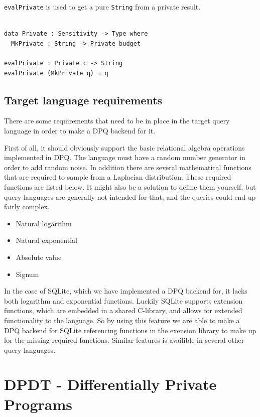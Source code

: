 \documentclass[12pt]{report}
\begin{document}
\texttt{evalPrivate} is used to get a pure \texttt{String} from a private result.

\begin{lstlisting}[caption={Aggregation result ADT},label={lst:DPQ_private}]

data Private : Sensitivity -> Type where
  MkPrivate : String -> Private budget

evalPrivate : Private c -> String
evalPrivate (MkPrivate q) = q

\end{lstlisting}

\section{Target language requirements}\label{sec:DPQ_requirements}

There are some requirements that need to be in place in the target query language in order to make a DPQ backend for it.

First of all, it should obviously support the basic relational algebra operations implemented in DPQ.
The language must have a random number generator in order to add random noise.
In addition there are several mathematical functions that are required to sample from a Laplacian distribution.
These required functions are listed below.
It might also be a solution to define them yourself, but query languages are generally not intended for that, and the queries could end up fairly complex.

\begin{itemize}
    \item Natural logarithm
    \item Natural exponential
    \item Absolute value
    \item Signum
\end{itemize}

In the case of SQLite, which we have implemented a DPQ backend for, it lacks both logarithm and exponential functions.
Luckily SQLite supports extension functions, which are embedded in a shared C-library, and allows for extended functionality to the language.
So by using this feature we are able to make a DPQ backend for SQLite referencing functions in the exension library to make up for the missing required functions.
Similar features is availible in several other query languages.

\chapter{DPDT - Differentially Private Programs}\label{sec:DPDT}
\end{document}

